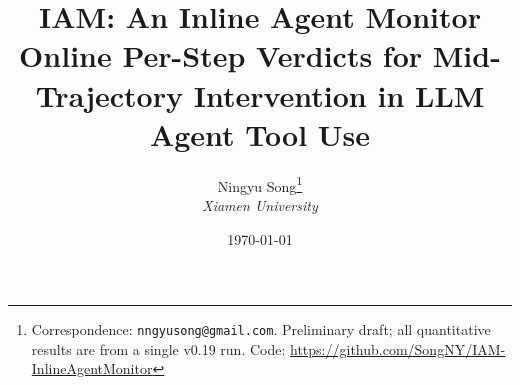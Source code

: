\documentclass[11pt]{article}
\title{IAM: An Inline Agent Monitor\\
Online Per-Step Verdicts for Mid-Trajectory Intervention in LLM Agent Tool Use}
\author{%
  Ningyu Song\thanks{Correspondence: \texttt{nngyusong@gmail.com}.
  Preliminary draft; all quantitative results are from a single v0.19 run.
  Code: \url{https://github.com/SongNY/IAM-InlineAgentMonitor}}\\
  \textit{Xiamen University}\\
}
\date{\today}
\begin{document}
\maketitle

\begin{abstract}

\end{abstract}











\end{document}
